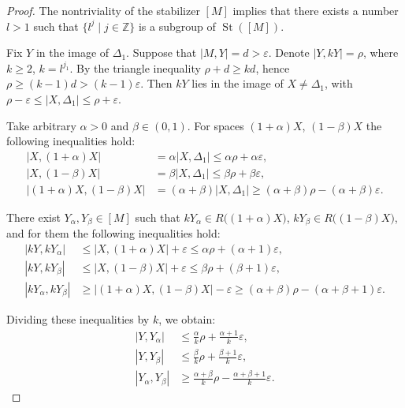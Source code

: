 \documentclass[leqno]{article}
\begin{document}
\begin{proof}
    The nontriviality of the stabilizer $[M]$ implies that there exists
    a number $l > 1$ such that $\{l^{j} \mid j\in \mathbb{Z}\}$ is a
    subgroup of $\operatorname{St}([M])$.

    Fix $Y$ in the image of $\Delta_{1}$. Suppose that $|M, Y| = d >
    \varepsilon$. Denote $|Y, kY| = \rho$, where $k \geq 2$, $k =
    l^{j_{1}}$. By the triangle inequality $\rho + d \geq kd$, hence
    $\rho \geq (k-1)d > (k-1)\varepsilon$. Then $kY$ lies in the image
    of $X \neq \Delta_1$, with $\rho - \varepsilon \leq |X, \Delta_1|
    \leq \rho + \varepsilon$.

    Take arbitrary $\alpha > 0$ and $\beta \in (0,1)$. For spaces
    $(1+\alpha)X$, $(1-\beta)X$ the following inequalities hold:
    \begin{align*}
        |X, (1+\alpha)X| &= \alpha |X, \Delta_1| \leq \alpha\rho +
        \alpha\varepsilon, \\
        |X, (1-\beta)X| &= \beta|X, \Delta_1| \leq \beta\rho +
        \beta\varepsilon, \\
        |(1+\alpha) X, (1-\beta)X| &= (\alpha + \beta)|X, \Delta_1| \geq
        (\alpha+\beta)\rho - (\alpha+\beta)\varepsilon.
    \end{align*}

    There exist $Y_\alpha, Y_\beta \in [M]$ such that $kY_\alpha \in
    R\big((1+\alpha)X\big)$, $kY_\beta \in R\big((1-\beta)X\big)$, and
    for them the following inequalities hold:
    \begin{align*}
        |kY, kY_\alpha| &\leq |X, (1+\alpha)X| + \varepsilon \leq
        \alpha\rho + (\alpha+1)\varepsilon, \\
        |kY, kY_\beta| &\leq |X, (1-\beta)X| + \varepsilon \leq \beta\rho
        + (\beta+1)\varepsilon, \\
        |kY_\alpha, kY_\beta| &\geq |(1+\alpha)X, (1-\beta)X| -
        \varepsilon \geq (\alpha+\beta)\rho - (\alpha+\beta+1)\varepsilon.
    \end{align*}

    Dividing these inequalities by $k$, we obtain:
    \begin{align*}
        |Y, Y_{\alpha}| &\leq \frac{\alpha}{k}\rho +
        \frac{\alpha+1}{k}\varepsilon, \\
        |Y, Y_{\beta}| &\leq \frac{\beta}{k}\rho +
        \frac{\beta+1}{k}\varepsilon, \\
        |Y_\alpha, Y_{\beta}| &\geq \frac{\alpha+\beta}{k}\rho -
        \frac{\alpha+\beta+1}{k}\varepsilon.
    \end{align*}


\end{proof}
\end{document}
